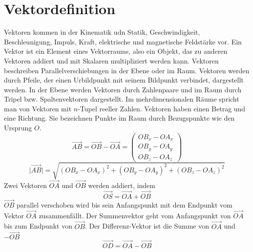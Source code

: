 \section{Vektordefinition}
Vektoren kommen in der Kinematik udn Statik, Geschwindigkeit, Beschleunigung, Impuls, Kraft, elektrische und magnetische Feldstärke vor.
\newline\newline
Ein Vektor ist ein Element eines Vektorraums, also ein Objekt, das zu anderen Vektoren addiert und mit Skalaren multipliziert werden kann. Vektoren beschreiben Parallelverschiebungen in der Ebene oder im Raum. Vektoren werden durch Pfeile, der einen Urbildpunkt mit seinem Bildpunkt verbindet, dargestellt werden. In der Ebene werden Vektoren durch Zahlenpaare und im Raum durch Tripel bzw. Spaltenvektoren dargestellt. Im mehrdimensionalen Räume spricht man von Vektoren mit $n$-Tupel reeller Zahlen.
\newline\newline
Vektoren haben einen Betrag und eine Richtung. Sie bezeichnen Punkte im Raum durch Bezugspunkte wie den Ursprung $O$.
\begin{equation}
\boxed{\overrightarrow{AB}=\overrightarrow{OB}-\overrightarrow{OA}=\begin{pmatrix}OB_x-OA_x\\OB_y-OA_y\\OB_z-OA_z\end{pmatrix}}
\end{equation}
\begin{equation}
\boxed{\vert \overrightarrow{AB}\vert=\sqrt{(OB_x-OA_x)^2+(OB_y-OA_y)^2+(OB_z-OA_z)^2}}
\end{equation}
Zwei Vektoren $\overrightarrow{OA}$ und $\overrightarrow{OB}$ werden addiert, indem
\begin{equation}
\boxed{\overrightarrow{OS}=\overrightarrow{OA}+\overrightarrow{OB}}
\end{equation}
$\overrightarrow{OB}$ parallel verschoben wird bis sein Anfangspunkt mit dem Endpunkt vom Vektor $\overrightarrow{OA}$ zusammenfällt. Der Summenvektor geht vom Anfangspunkt von $\overrightarrow{OA}$ bis zum Endpunkt von $\overrightarrow{OB}$.
\newline\newline
Der Differenz-Vektor ist die Summe von $\overrightarrow{OA}$ und $-\overrightarrow{OB}$
\begin{equation}
\boxed{\overrightarrow{OD}=\overrightarrow{OA}-\overrightarrow{OB}}
\end{equation}
